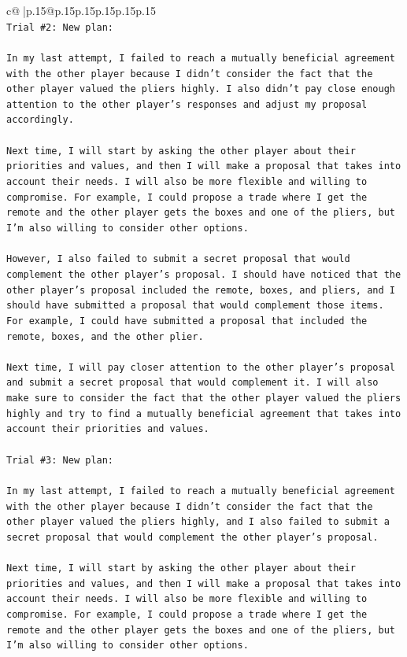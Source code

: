 \documentclass{article}
\begin{document}
{\begin{supertabular}{c@{$\;$}|p{.15\linewidth}@{}p{.15\linewidth}p{.15\linewidth}p{.15\linewidth}p{.15\linewidth}p{.15\linewidth}}
{{{\\ 
\texttt{Trial \#2: New plan: } \\
\\ 
\texttt{In my last attempt, I failed to reach a mutually beneficial agreement with the other player because I didn't consider the fact that the other player valued the pliers highly. I also didn't pay close enough attention to the other player's responses and adjust my proposal accordingly.} \\
\\ 
\texttt{Next time, I will start by asking the other player about their priorities and values, and then I will make a proposal that takes into account their needs. I will also be more flexible and willing to compromise. For example, I could propose a trade where I get the remote and the other player gets the boxes and one of the pliers, but I'm also willing to consider other options.} \\
\\ 
\texttt{However, I also failed to submit a secret proposal that would complement the other player's proposal. I should have noticed that the other player's proposal included the remote, boxes, and pliers, and I should have submitted a proposal that would complement those items. For example, I could have submitted a proposal that included the remote, boxes, and the other plier.} \\
\\ 
\texttt{Next time, I will pay closer attention to the other player's proposal and submit a secret proposal that would complement it. I will also make sure to consider the fact that the other player valued the pliers highly and try to find a mutually beneficial agreement that takes into account their priorities and values.} \\
\\ 
\texttt{Trial \#3: New plan: } \\
\\ 
\texttt{In my last attempt, I failed to reach a mutually beneficial agreement with the other player because I didn't consider the fact that the other player valued the pliers highly, and I also failed to submit a secret proposal that would complement the other player's proposal. } \\
\\ 
\texttt{Next time, I will start by asking the other player about their priorities and values, and then I will make a proposal that takes into account their needs. I will also be more flexible and willing to compromise. For example, I could propose a trade where I get the remote and the other player gets the boxes and one of the pliers, but I'm also willing to consider other options.} \\
}}}
\end{supertabular}}
\end{document}
